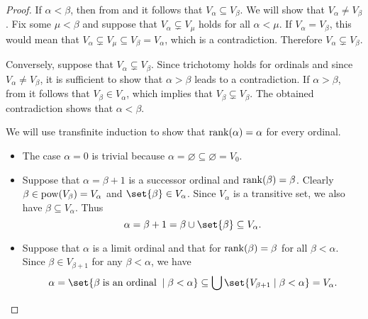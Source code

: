 \begin{proof}
   If \( \alpha < \beta \), then from  and  it follows that \( V_\alpha \subseteq V_\beta \). We will show that \( V_\alpha \neq V_\beta \). Fix some \( \mu < \beta \) and suppose that \( V_\alpha \subsetneq V_\mu \) holds for all \( \alpha < \mu \). If \( V_\alpha = V_\beta \), this would mean that \( V_\alpha \subsetneq V_\mu \subseteq V_\beta = V_\alpha \), which is a contradiction. Therefore \( V_\alpha \subsetneq V_\beta \).

  Conversely, suppose that \( V_\alpha \subsetneq V_\beta \). Since trichotomy holds for ordinals and since \( V_\alpha \neq V_\beta \), it is sufficient to show that \( \alpha > \beta \) leads to a contradiction. If \( \alpha > \beta \), from  it follows that \( V_\beta \in V_\alpha \), which implies that \( V_\beta \subsetneq V_\beta \). The obtained contradiction shows that \( \alpha < \beta \).

   We will use transfinite induction to show that \( \operatorname{rank}(\alpha) = \alpha \) for every ordinal.
  \begin{itemize}
    \item The case \( \alpha = 0 \) is trivial because \( \alpha = \varnothing \subseteq \varnothing = V_0 \).

    \item Suppose that \( \alpha = \beta + 1 \) is a successor ordinal and \( \operatorname{rank}(\beta) = \beta \). Clearly \( \beta \in \operatorname{pow}(V_\beta) = V_\alpha \) and \( \set{ \beta } \in V_\alpha \). Since \( V_\alpha \) is a transitive set, we also have \( \beta \subseteq V_\alpha \). Thus
    \begin{equation*}
      \alpha = \beta + 1 = \beta \cup \set{ \beta } \subseteq V_\alpha.
    \end{equation*}

    \item Suppose that \( \alpha \) is a limit ordinal and that for \( \operatorname{rank}(\beta) = \beta \) for all \( \beta < \alpha \). Since \( \beta \in V_{\beta + 1} \) for any \( \beta < \alpha \), we have
    \begin{equation*}
      \alpha
      =
      \set{ \beta \T{is an ordinal} \given \beta < \alpha }
      \subseteq
      \bigcup\set{ V_{\beta + 1} \given \beta < \alpha }
      =
      V_\alpha.
    \end{equation*}
  \end{itemize}


\end{proof}
